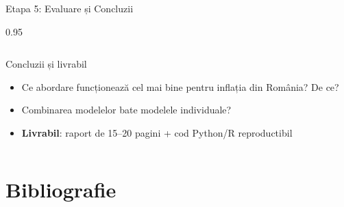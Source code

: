 \documentclass[9pt, aspectratio=169, t]{beamer}
\begin{document}
\begin{frame}{Etapa 5: Evaluare și Concluzii}
\begin{cminipage}{0.95\textwidth}
{\begin{columns}[T]
            \begin{alertblock}{Concluzii și livrabil}
                \begin{itemize}\setlength{\itemsep}{0pt}
                    \item Ce abordare funcționează cel mai bine pentru inflația din România? De ce?
                    \item Combinarea modelelor bate modelele individuale?
                    \item \textbf{Livrabil}: raport de 15--20 pagini + cod Python/R reproductibil
                \end{itemize}
            \end{alertblock}
        \end{columns}
        }
    \end{cminipage}
\end{frame}

\section{Bibliografie}
\end{document}
